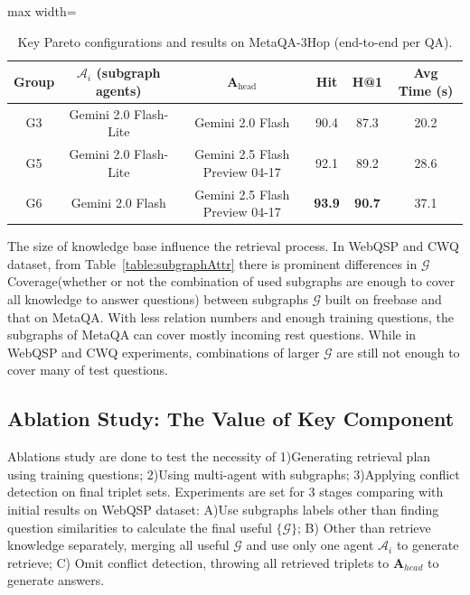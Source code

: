 \documentclass[sigconf]{acmart}
\begin{document}
\begin{table}[h]
  \centering
  \caption{Key Pareto configurations and results on MetaQA-3Hop (end-to-end per QA).}
  \label{table:diffAgents-core}
  \vspace{-2mm}
  \begin{adjustbox}{max width=\textwidth}
  \begin{tabular}{c|c|c|cc|c}
    \toprule
    Group & \(\mathcal{A}_i\) (subgraph agents) & \(\mathbf{A}_{\text{head}}\) & \textbf{Hit} & \textbf{H@1} & \textbf{Avg Time (s)} \\
    \midrule
    G3 & Gemini 2.0 Flash-Lite & Gemini 2.0 Flash & 90.4 & 87.3 & 20.2 \\
    G5 & Gemini 2.0 Flash-Lite & Gemini 2.5 Flash Preview 04-17 & 92.1 & 89.2 & 28.6 \\
    G6 & Gemini 2.0 Flash & Gemini 2.5 Flash Preview 04-17 & \textbf{93.9} & \textbf{90.7} & 37.1 \\
    \bottomrule
  \end{tabular}
  \end{adjustbox}
  \vspace{-2mm}
\end{table}

The size of knowledge base influence the retrieval process. In WebQSP and CWQ dataset, from Table~\ref{table:subgraphAttr} there is prominent differences in $\mathcal{G}$ Coverage(whether or not the combination of used subgraphs are enough to cover all knowledge to answer questions) between subgraphs $\mathcal{G}$ built on freebase and that on MetaQA. With less relation numbers and enough training questions, the subgraphs of MetaQA can cover mostly incoming rest questions. While in WebQSP and CWQ experiments, combinations of larger $\mathcal{G}$ are still not enough to cover many of test questions.

\subsection{Ablation Study: The Value of Key Component} \label{ablation}



Ablations study are done to test the necessity of 1)Generating retrieval plan using training questions; 2)Using multi-agent with subgraphs; 3)Applying conflict detection on final triplet sets. Experiments are set for 3 stages comparing with initial results on WebQSP dataset: A)Use subgraphs labels other than finding question similarities to calculate the final useful $\{\mathcal{G}\}$; B) Other than retrieve knowledge separately, merging all useful $\mathcal{G}$ and use only one agent $\mathcal{A}_i$ to generate retrieve; C) Omit conflict detection, throwing all retrieved triplets to $\mathbf{A}_{head}$ to generate answers. 
\end{document}
